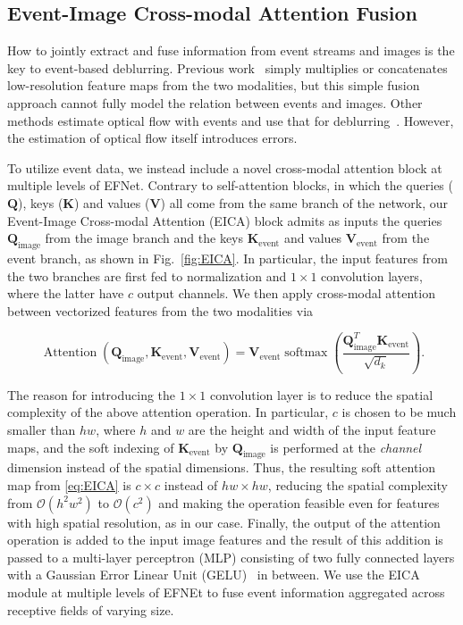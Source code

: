 \documentclass[runningheads]{llncs}
\DeclareMathOperator*{\softmax}{softmax}
\DeclareMathOperator*{\attention}{Attention}
\newlength \g
\begin{document}
\subsection{Event-Image Cross-modal Attention Fusion}
\label{sec:method:eica}

How to jointly extract and fuse information from event streams and images is the key to event-based deblurring. Previous work~\cite{jiang2020learning_event_motion_deblur,lin2020learning_event_video_deblur} simply multiplies or concatenates low-resolution feature maps from the two modalities, but this simple fusion approach cannot fully model the relation between events and images. Other methods estimate optical flow with events and use that for deblurring~\cite{shang2021bringing}. However, the estimation of optical flow itself introduces errors.

To utilize event data, we instead include a novel cross-modal attention block at multiple levels of EFNet. Contrary to self-attention blocks, in which the queries ($\mathbf{Q}$), keys ($\mathbf{K}$) and values ($\mathbf{V}$) all come from the same branch of the network, our Event-Image Cross-modal Attention (EICA) block admits as inputs the queries $\mathbf{Q}_{\text{image}}$ from the image branch and the keys $\mathbf{K}_{\text{event}}$ and values $\mathbf{V}_{\text{event}}$ from the event branch, as shown in Fig.~\ref{fig:EICA}. In particular, the input features from the two branches are first fed to normalization and $1\times1$ convolution layers, where the latter have $c$ output channels. We then apply cross-modal attention between vectorized features from the two modalities via

\begin{equation} \label{eq:EICA}
  \attention(\mathbf{Q}_{\text{image}},\mathbf{K}_{\text{event}},\mathbf{V}_{\text{event}}) = \mathbf{V}_{\text{event}}\softmax\left(\frac{\mathbf{Q}^{T}_{\text{image}}\mathbf{K}_{\text{event}}}{\sqrt{d_{k}}}\right).
\end{equation}

The reason for introducing the $1\times1$ convolution layer is to reduce the spatial complexity of the above attention operation. In particular, $c$ is chosen to be much smaller than $hw$, where $h$ and $w$ are the height and width of the input feature maps, and the soft indexing of $\mathbf{K}_{\text{event}}$ by $\mathbf{Q}_{\text{image}}$ is performed at the \emph{channel} dimension instead of the spatial dimensions. Thus, the resulting soft attention map from \eqref{eq:EICA} is $c\times{}c$ instead of $hw\times{}hw$, reducing the spatial complexity from $\mathcal{O}(h^2w^2)$ to $\mathcal{O}(c^2)$ and making the operation feasible even for features with high spatial resolution, as in our case.
Finally, the output of the attention operation is added to the input image features and the result of this addition is passed to a  multi-layer perceptron (MLP) consisting of two fully connected layers with a Gaussian Error Linear Unit (GELU)~\cite{hendrycks2016gaussian} in between. We use the EICA module at multiple levels of EFNEt to fuse event information aggregated across receptive fields of varying size.
\end{document}
